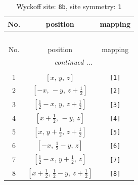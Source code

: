\documentclass[fleqn,8pt]{jsarticle}
\begin{document}
\begin{longtable}{ccc}
\caption{Wyckoff site: {\tt 8b}, site symmetry: {\tt 1}}
 \\
 \hline \hline
No. & position & mapping \\ \hline \endfirsthead

\multicolumn{2}{l}{\tablename\ \thetable{}} \\
 \hline \hline
No. & position & mapping \\ \hline \endhead

 \hline \hline
\multicolumn{2}{r}{\footnotesize\it continued ...} \\ \endfoot

 \hline \hline
\multicolumn{2}{r}{} \\ \endlastfoot

1 & $\left[ x,\, y,\, z \right]$ & {\tt [1]} \\ \hline
2 & $\left[ - x,\, - y,\, z + \frac{1}{2} \right]$ & {\tt [2]} \\ \hline
3 & $\left[ \frac{1}{2} - x,\, y,\, z + \frac{1}{2} \right]$ & {\tt [3]} \\ \hline
4 & $\left[ x + \frac{1}{2},\, - y,\, z \right]$ & {\tt [4]} \\ \hline
5 & $\left[ x,\, y + \frac{1}{2},\, z + \frac{1}{2} \right]$ & {\tt [5]} \\ \hline
6 & $\left[ - x,\, \frac{1}{2} - y,\, z \right]$ & {\tt [6]} \\ \hline
7 & $\left[ \frac{1}{2} - x,\, y + \frac{1}{2},\, z \right]$ & {\tt [7]} \\ \hline
8 & $\left[ x + \frac{1}{2},\, \frac{1}{2} - y,\, z + \frac{1}{2} \right]$ & {\tt [8]} \\
\end{longtable}
\end{document}
